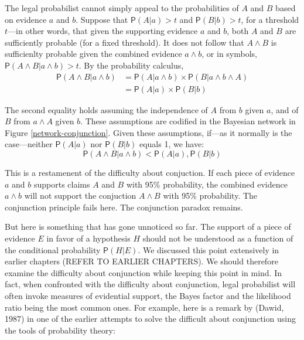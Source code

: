 \documentclass[10pt,dvipsnames,enabledeprecatedfontcommands]{scrartcl}
\newcommand{\et}{\wedge}
\newcommand{\pr}[1]{\mathsf{P}(#1)}
\begin{document}
The legal probabilist cannot simply appeal to the probabilities of \(A\)
and \(B\) based on evidence \(a\) and \(b\). Suppose that
\(\pr{A | a}>t\) and \(\pr{B | b}>t\), for a threshold \(t\)---in other
words, that given the supporting evidence \(a\) and \(b\), both \(A\)
and \(B\) are sufficiently probable (for a fixed threshold). It does not
follow that \(A \et B\) is sufficienlty probable given the combined
evidence \(a\et b\), or in symbols, \(\pr{A \wedge B | a \wedge b}>t\).
By the probability calculus, \begin{align*}
\pr{A \wedge  B | a \wedge b}& =\pr{A |a \wedge b} \times \pr{B | a \wedge b \wedge A}\\
 & = \pr{A |a} \times \pr{B | b}
 \end{align*}

\noindent The second equality holds assuming the independence of \(A\)
from \(b\) given \(a\), and of \(B\) from \(a \et A\) given \(b\).
These assumptions are codified in the Bayesian network in Figure
\ref{network-conjunction}.
 Given
these assumptions, if---as it normally is the case---neither
\(\pr{A \vert a}\) nor \(\pr{B \vert b}\) equals 1, we have:
\[\pr{A \wedge B \vert a \wedge b}< \pr{A \vert a}, \pr{B \vert b}  \]

\noindent This is a restamenent of the difficulty about conjuction. If
each piece of evidence \(a\) and \(b\) supports claims \(A\) and \(B\)
with 95\% probability, the combined evidence \(a\et b\) will not support
the conjuction \(A\et B\) with 95\% probability. The conjunction
principle fails here. The conjunction paradox remains.

But here is something that has gone unnoticed so far. The support of a
piece of evidence \(E\) in favor of a hypothesis \(H\) should not be
understood as a function of the conditional probability \(\pr{H | E}\).
We discussed this point extensively in earlier chapters (REFER TO
EARLIER CHAPTERS). We should therefore examine the difficulty about
conjunction while keeping this point in mind. In fact, when confronted
with the difficulty about conjunction, legal probabilist will often
invoke measures of evidential support, the Bayes factor and the
likelihood ratio being the most common ones. For example, here is a
remark by (Dawid, 1987) in one of the earlier attempts to solve the
difficult about conjunction using the tools of probability theory:
\end{document}

